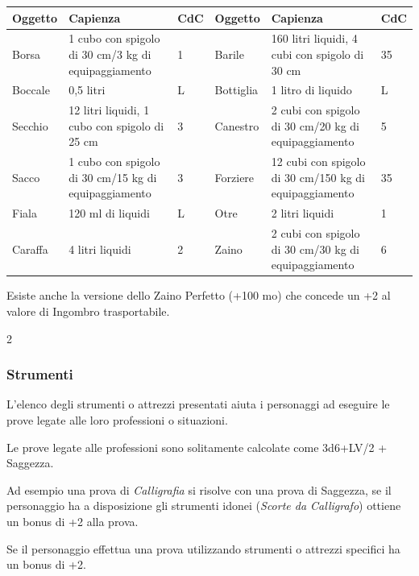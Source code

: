 \noindent\begin{tabularx}{\linewidth}{lXl|lXl}
	\toprule
\rowcolor{gray!20}\textbf{Oggetto}&\textbf{Capienza}&\textbf{CdC}&\textbf{Oggetto}&\textbf{Capienza}&\textbf{CdC}\\
\toprule
Borsa&1 cubo con spigolo di 30 cm/3 kg di equipaggiamento&1&Barile&160 litri liquidi, 4 cubi con spigolo di 30 cm&35\\
\rowcolor{gray!20}Boccale&0,5 litri&L&Bottiglia&1 litro di liquido&L\\
Secchio&12 litri liquidi, 1 cubo con spigolo di 25 cm&3&Canestro&2 cubi con spigolo di 30 cm/20 kg di equipaggiamento&5\\
\rowcolor{gray!20}Sacco&1 cubo con spigolo di 30 cm/15 kg di equipaggiamento&3&Forziere&12 cubi con spigolo di 30 cm/150 kg di equipaggiamento&35\\
Fiala&120 ml di liquidi&L&Otre&2 litri liquidi&1\\
\rowcolor{gray!20}Caraffa&4 litri liquidi&2&Zaino&2 cubi con spigolo di 30 cm/30 kg di equipaggiamento&6
\end{tabularx}

\medskip

Esiste anche la versione dello Zaino Perfetto (+100 mo) che concede un +2 al valore di Ingombro trasportabile.

\begin{multicols}{2}

\subsubsection{Strumenti}

L'elenco degli strumenti o attrezzi presentati aiuta i personaggi ad eseguire le prove legate alle loro professioni o situazioni.

Le prove legate alle professioni sono solitamente calcolate come 3d6+LV/2 + Saggezza.

Ad esempio una prova di \emph{Calligrafia} si risolve con una prova di Saggezza, se il personaggio ha a disposizione gli strumenti idonei (\emph{Scorte da Calligrafo}) ottiene un bonus di +2 alla prova.

Se il personaggio effettua una prova utilizzando strumenti o attrezzi specifici ha un bonus di +2.

\end{multicols}

\medskip

